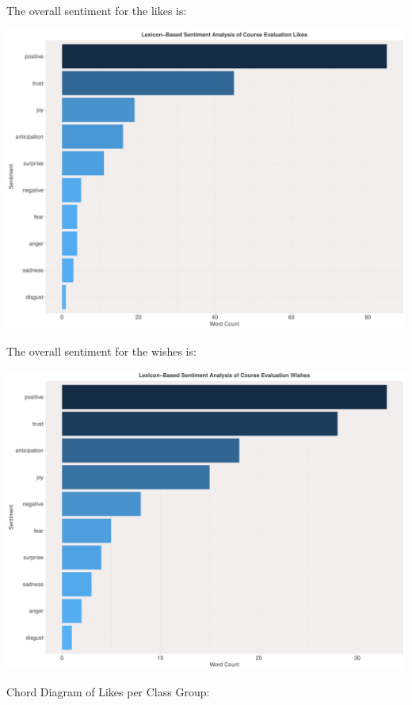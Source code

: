 \documentclass[
]{article}
\begin{document}
The overall sentiment for the likes is:

\includegraphics{AnalysisOfCourseEvaluation-Notebook_files/figure-latex/OverallSentimentForLikes-1.pdf}

\newpage

The overall sentiment for the wishes is:

\includegraphics{AnalysisOfCourseEvaluation-Notebook_files/figure-latex/OverallSentimentForWishes-1.pdf}

\newpage

Chord Diagram of Likes per Class Group:
\end{document}
